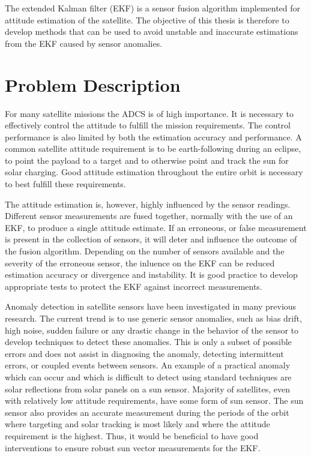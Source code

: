 The extended Kalman filter (EKF) is a sensor fusion algorithm implemented for attitude estimation of the satellite. The objective of this thesis is therefore to develop methods that can be used to avoid unstable and inaccurate estimations from the EKF caused by sensor anomalies.

\section{Problem Description}
For many satellite missions the ADCS is of high importance. It is necessary to effectively control the attitude to fulfill the mission requirements. The control performance is also limited by both the estimation accuracy and performance. A common satellite attitude requirement is to be earth-following during an eclipse, to point the payload to a target and to otherwise point and track the sun for solar charging. Good attitude estimation throughout the entire orbit is necessary to best fulfill these requirements.

The attitude estimation is, however, highly influenced by the sensor readings. Different sensor measurements are fused together, normally with the use of an EKF, to produce a single attitude estimate. If an erroneous, or false measurement is present in the collection of sensors, it will deter and influence the outcome of the fusion algorithm.  Depending on the number of sensors available and the severity of the erroneous sensor, the inluence on the EKF can be reduced estimation accuracy or divergence and instability. It is good practice to develop appropriate tests to protect the EKF against incorrect measurements. 

Anomaly detection in satellite sensors have been investigated in many previous research. The current trend is to use generic sensor anomalies, such as bias drift, high noise, sudden failure or any drastic change in the behavior of the sensor to develop techniques to detect these anomalies. This is only a subset of possible errors and does not assist in diagnosing the anomaly, detecting intermittent errors, or coupled events between sensors. An example of a practical anomaly which can occur and which is difficult to detect using standard techniques are solar reflections from solar panels on a sun sensor. Majority of satellites, even with relatively low attitude requirements, have some form of sun sensor. The sun sensor also provides an accurate measurement during the periods of the orbit where targeting and solar tracking is most likely and where the attitude requirement is the highest. Thus, it would be beneficial to have good interventions to ensure robust sun vector measurements for the EKF.

